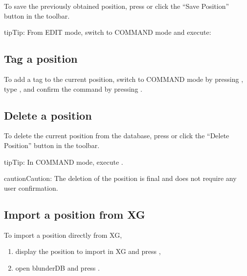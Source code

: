 \documentclass[letterpaper,10pt,english]{sphinxmanual}
\begin{document}
\sphinxAtStartPar
To save the previously obtained position, press  or click the “Save Position” button in the toolbar.

\begin{sphinxadmonition}{tip}{Tip:}
\sphinxAtStartPar
From EDIT mode, switch to COMMAND mode and execute: 
\end{sphinxadmonition}


\subsection{Tag a position}
\label{\detokenize{guide_utilisateur:etiqueter-une-position}}
\sphinxAtStartPar
To add a tag  to the current position, switch to COMMAND mode by pressing , type , and confirm the command by pressing .


\subsection{Delete a position}
\label{\detokenize{guide_utilisateur:supprimer-une-position}}
\sphinxAtStartPar
To delete the current position from the database, press  or click the “Delete Position” button in the toolbar.

\begin{sphinxadmonition}{tip}{Tip:}
\sphinxAtStartPar
In COMMAND mode, execute .
\end{sphinxadmonition}

\begin{sphinxadmonition}{caution}{Caution:}
\sphinxAtStartPar
The deletion of the position is final and does not require any user confirmation.
\end{sphinxadmonition}


\subsection{Import a position from XG}
\label{\detokenize{guide_utilisateur:import-une-position-depuis-xg}}
\sphinxAtStartPar
To import a position directly from XG,
\begin{enumerate}
%
\item {} 
\sphinxAtStartPar
display the position to import in XG and press ,

\item {} 
\sphinxAtStartPar
open blunderDB and press .

\end{enumerate}
\end{document}
